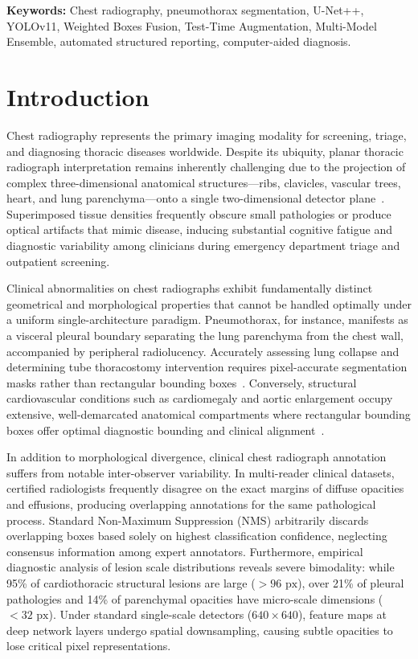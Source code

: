 \documentclass[10pt,twocolumn,letterpaper]{article}
\begin{document}
\noindent\textbf{Keywords:} Chest radiography, pneumothorax segmentation, U-Net++, YOLOv11, Weighted Boxes Fusion, Test-Time Augmentation, Multi-Model Ensemble, automated structured reporting, computer-aided diagnosis.

\section{Introduction}
Chest radiography represents the primary imaging modality for screening, triage, and diagnosing thoracic diseases worldwide. Despite its ubiquity, planar thoracic radiograph interpretation remains inherently challenging due to the projection of complex three-dimensional anatomical structures---ribs, clavicles, vascular trees, heart, and lung parenchyma---onto a single two-dimensional detector plane~\cite{litjens2017survey}. Superimposed tissue densities frequently obscure small pathologies or produce optical artifacts that mimic disease, inducing substantial cognitive fatigue and diagnostic variability among clinicians during emergency department triage and outpatient screening.

Clinical abnormalities on chest radiographs exhibit fundamentally distinct geometrical and morphological properties that cannot be handled optimally under a uniform single-architecture paradigm. Pneumothorax, for instance, manifests as a visceral pleural boundary separating the lung parenchyma from the chest wall, accompanied by peripheral radiolucency. Accurately assessing lung collapse and determining tube thoracostomy intervention requires pixel-accurate segmentation masks rather than rectangular bounding boxes~\cite{siim2019pneumothorax}. Conversely, structural cardiovascular conditions such as cardiomegaly and aortic enlargement occupy extensive, well-demarcated anatomical compartments where rectangular bounding boxes offer optimal diagnostic bounding and clinical alignment~\cite{nguyen2022vindrcxr}.

In addition to morphological divergence, clinical chest radiograph annotation suffers from notable inter-observer variability. In multi-reader clinical datasets, certified radiologists frequently disagree on the exact margins of diffuse opacities and effusions, producing overlapping annotations for the same pathological process. Standard Non-Maximum Suppression (NMS) arbitrarily discards overlapping boxes based solely on highest classification confidence, neglecting consensus information among expert annotators. Furthermore, empirical diagnostic analysis of lesion scale distributions reveals severe bimodality: while 95\% of cardiothoracic structural lesions are large ($>96\text{ px}$), over 21\% of pleural pathologies and 14\% of parenchymal opacities have micro-scale dimensions ($<32\text{ px}$). Under standard single-scale detectors ($640\times 640$), feature maps at deep network layers undergo spatial downsampling, causing subtle opacities to lose critical pixel representations.
\end{document}
